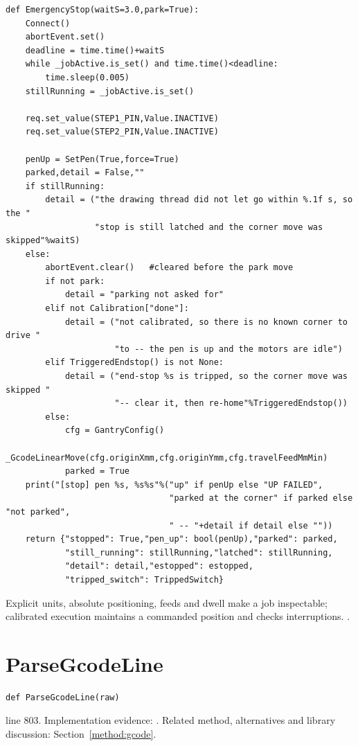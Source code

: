 \begin{lstlisting}[style=plain]
def EmergencyStop(waitS=3.0,park=True):
    Connect()
    abortEvent.set()
    deadline = time.time()+waitS
    while _jobActive.is_set() and time.time()<deadline:
        time.sleep(0.005)
    stillRunning = _jobActive.is_set()

    req.set_value(STEP1_PIN,Value.INACTIVE)
    req.set_value(STEP2_PIN,Value.INACTIVE)

    penUp = SetPen(True,force=True)
    parked,detail = False,""
    if stillRunning:
        detail = ("the drawing thread did not let go within %.1f s, so the "
                  "stop is still latched and the corner move was skipped"%waitS)
    else:
        abortEvent.clear()   #cleared before the park move
        if not park:
            detail = "parking not asked for"
        elif not Calibration["done"]:
            detail = ("not calibrated, so there is no known corner to drive "
                      "to -- the pen is up and the motors are idle")
        elif TriggeredEndstop() is not None:
            detail = ("end-stop %s is tripped, so the corner move was skipped "
                      "-- clear it, then re-home"%TriggeredEndstop())
        else:
            cfg = GantryConfig()
            _GcodeLinearMove(cfg.originXmm,cfg.originYmm,cfg.travelFeedMmMin)
            parked = True
    print("[stop] pen %s, %s%s"%("up" if penUp else "UP FAILED",
                                 "parked at the corner" if parked else "not parked",
                                 " -- "+detail if detail else ""))
    return {"stopped": True,"pen_up": bool(penUp),"parked": parked,
            "still_running": stillRunning,"latched": stillRunning,
            "detail": detail,"estopped": estopped,
            "tripped_switch": TrippedSwitch}
\end{lstlisting}
Explicit units, absolute positioning, feeds and dwell make a job inspectable; calibrated execution maintains a commanded position and checks interruptions. \cite{code2026,linuxcnc}.


\section{ParseGcodeLine}\label{fn:reproduce:ParseGcodeLine}
\begin{lstlisting}[style=sig]
def ParseGcodeLine(raw)
\end{lstlisting}
 line 803. Implementation evidence: \cite{code2026}. Related method, alternatives and library discussion: Section~\ref{method:gcode}.


